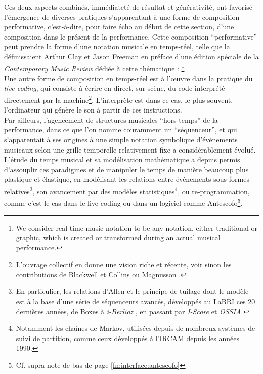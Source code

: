 \indent Ces deux aspects combinés, immédiateté de résultat et générativité, ont favorisé l'émergence de diverses pratiques s'apparentant à une forme de composition performative, c'est-à-dire, pour faire écho au début de cette section, d'une composition dans le présent de la performance. Cette composition ``performative'' peut prendre la forme d'une notation musicale en temps-réel, telle que la définissaient Arthur Clay et Jason Freeman en préface d'une édition spéciale de la \textit{Contemporary Music Review} dédiée à cette thématique \cite{clay_preface_2010}: \footnote{We consider real-time music notation to be any notation, either traditional or graphic, which is created or transformed during an actual musical performance.}\\
\indent Une autre forme de composition en temps-réel est à l'œuvre dans la pratique du \textit{live-coding}, qui consiste à écrire en direct, sur scène, du code interprété directement par la machine\footnote{L'ouvrage collectif \cite{mclean_oxford_2018} en donne une vision riche et récente, voir sinon les contributions de Blackwell et Collins \cite{blackwell_programming_2005} ou Magnusson \cite{magnusson_algorithms_2011}.}. L'interprète est dans ce cas, le plus souvent, l'ordinateur qui génère le son à partir de ces instructions.\\
\indent Par ailleurs, l'agencement de structures musicales ``hors temps'' de la performance, dans ce que l'on nomme couramment un ``séquenceur'', et qui s'apparentait à ses origines à une simple notation symbolique d'événements musicaux selon une grille temporelle relativement fixe a considérablement évolué. L'étude du temps musical et sa modélisation mathématique a depuis permis d'assouplir ces paradigmes et de manipuler le temps de manière beaucoup plus plastique et élastique, en modélisant les relations entre événements sous formes relatives\footnote{En particulier, les relations d'Allen et le principe de tuilage \cite{berthaut_libtuile_2013} dont le modèle est à la base d'une série de séquenceurs avancés, développés au \gls{LaBRI} ces 20 dernières années, de Boxes à \textit{i-Berlioz} \cite{miranda_i-berlioz:_2019},  en passant par \textit{I-Score} \cite{desainte-catherine_interactive_2005} et \textit{OSSIA} \cite{celerier_ossia:_2015}}, son avancement par des modèles statistiques\footnote{Notamment les chaînes de Markov, utilisées depuis de nombreux systèmes de suivi de partition, comme ceux développés à l'\gls{IRCAM} depuis les années 1990.}, ou re-programmation, comme c'est le cas dans le live-coding ou dans un logiciel comme Antescofo\footnote{Cf. supra note de bas de page \ref{fn:interface:antescofo}}.\\
